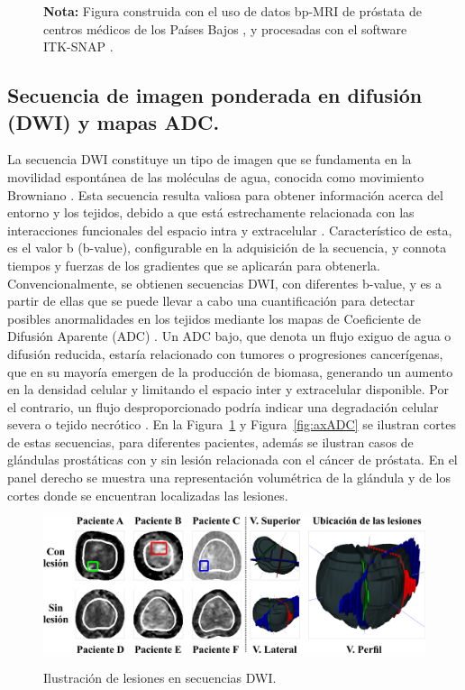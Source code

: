 \begin{figure}[h!]
\noindent \textbf{Nota:} Figura construida con el uso de datos bp-MRI de próstata de centros médicos de los Países Bajos , y  procesadas con el software ITK-SNAP .
\end{figure}



\newpage
\subsection{Secuencia de imagen ponderada en difusión (DWI) y mapas ADC. }La secuencia DWI constituye un tipo de imagen que se fundamenta en la movilidad espontánea de las moléculas de agua, conocida como movimiento Browniano . Esta secuencia resulta valiosa para obtener información acerca del entorno y los tejidos, debido a que está estrechamente relacionada con las interacciones funcionales del espacio intra y extracelular . Característico de esta, es el valor b (b-value), configurable en la adquisición de la secuencia, y connota tiempos y fuerzas de los gradientes que se aplicarán para obtenerla. Convencionalmente, se obtienen secuencias DWI, con diferentes b-value, y es a partir de ellas que se puede llevar a cabo una cuantificación para detectar posibles anormalidades en los tejidos mediante los mapas de Coeficiente de Difusión Aparente (ADC) . Un ADC bajo, que denota un flujo exiguo de agua o difusión reducida, estaría relacionado con tumores o progresiones cancerígenas, que en su mayoría emergen de la producción de biomasa, generando un aumento en la densidad celular y limitando el espacio inter y extracelular disponible. Por el contrario, un flujo desproporcionado podría indicar una degradación celular severa o tejido necrótico . En la 
Figura~\ref{fig:axDWI} y Figura~\ref{fig:axADC}
se ilustran cortes de estas secuencias, para diferentes pacientes, además se ilustran casos de glándulas prostáticas con y sin lesión relacionada con el cáncer de próstata. En el panel derecho se muestra una representación volumétrica de la glándula y de los cortes donde se encuentran localizadas las lesiones. 



\begin{figure}[h!]
\centering
\caption{Ilustración de lesiones en secuencias DWI.}
\includegraphics[width=1\textwidth]{imgs/DWISUMUP.png}
\label{fig:axDWI}
\end{figure}

